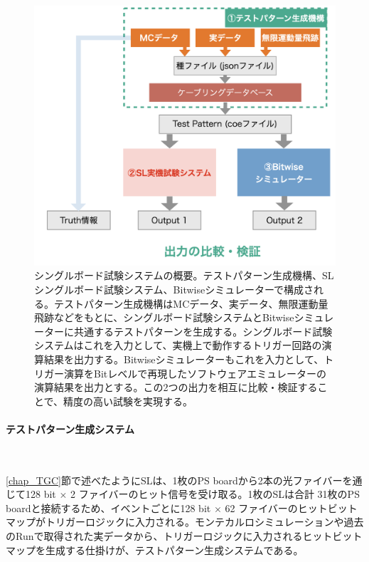 \begin{figure} 
\centering
\includegraphics[width=16cm]{fig/Test/Test_system.png}
\caption[シングルボード試験システムの概要]{シングルボード試験システムの概要。テストパターン生成機構、SLシングルボード試験システム、Bitwiseシミュレーターで構成される。テストパターン生成機構はMCデータ、実データ、無限運動量飛跡などをもとに、シングルボード試験システムとBitwiseシミュレーターに共通するテストパターンを生成する。シングルボード試験システムはこれを入力として、実機上で動作するトリガー回路の演算結果を出力する。Bitwiseシミュレーターもこれを入力として、トリガー演算をBitレベルで再現したソフトウェアエミュレーターの演算結果を出力とする。この2つの出力を相互に比較・検証することで、精度の高い試験を実現する。}
\label{Test_system}
\end{figure}

\paragraph{テストパターン生成システム}　　
\par
\ref{chap_TGC}節で述べたようにSLは、1枚のPS boardから2本の光ファイバーを通じて128 bit $\times$ 2 ファイバーのヒット信号を受け取る。1枚のSLは合計 31枚のPS boardと接続するため、イベントごとに128 bit $\times$ 62 ファイバーのヒットビットマップがトリガーロジックに入力される。モンテカルロシミュレーションや過去のRunで取得された実データから、トリガーロジックに入力されるヒットビットマップを生成する仕掛けが、テストパターン生成システムである。


